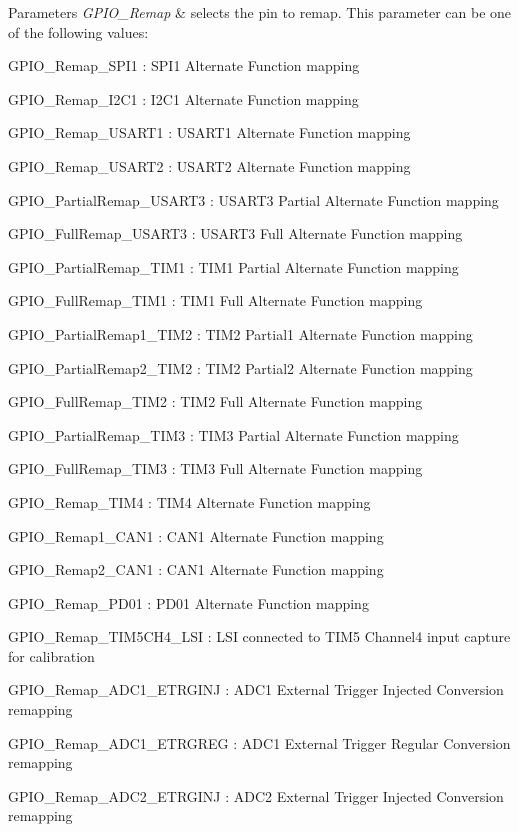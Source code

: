 \begin{DoxyParams}{Parameters}
{\em G\+P\+I\+O\+\_\+\+Remap} & selects the pin to remap. This parameter can be one of the following values\+: \begin{DoxyItemize}
\item G\+P\+I\+O\+\_\+\+Remap\+\_\+\+S\+P\+I1 \+: S\+P\+I1 Alternate Function mapping \item G\+P\+I\+O\+\_\+\+Remap\+\_\+\+I2\+C1 \+: I2\+C1 Alternate Function mapping \item G\+P\+I\+O\+\_\+\+Remap\+\_\+\+U\+S\+A\+R\+T1 \+: U\+S\+A\+R\+T1 Alternate Function mapping \item G\+P\+I\+O\+\_\+\+Remap\+\_\+\+U\+S\+A\+R\+T2 \+: U\+S\+A\+R\+T2 Alternate Function mapping \item G\+P\+I\+O\+\_\+\+Partial\+Remap\+\_\+\+U\+S\+A\+R\+T3 \+: U\+S\+A\+R\+T3 Partial Alternate Function mapping \item G\+P\+I\+O\+\_\+\+Full\+Remap\+\_\+\+U\+S\+A\+R\+T3 \+: U\+S\+A\+R\+T3 Full Alternate Function mapping \item G\+P\+I\+O\+\_\+\+Partial\+Remap\+\_\+\+T\+I\+M1 \+: T\+I\+M1 Partial Alternate Function mapping \item G\+P\+I\+O\+\_\+\+Full\+Remap\+\_\+\+T\+I\+M1 \+: T\+I\+M1 Full Alternate Function mapping \item G\+P\+I\+O\+\_\+\+Partial\+Remap1\+\_\+\+T\+I\+M2 \+: T\+I\+M2 Partial1 Alternate Function mapping \item G\+P\+I\+O\+\_\+\+Partial\+Remap2\+\_\+\+T\+I\+M2 \+: T\+I\+M2 Partial2 Alternate Function mapping \item G\+P\+I\+O\+\_\+\+Full\+Remap\+\_\+\+T\+I\+M2 \+: T\+I\+M2 Full Alternate Function mapping \item G\+P\+I\+O\+\_\+\+Partial\+Remap\+\_\+\+T\+I\+M3 \+: T\+I\+M3 Partial Alternate Function mapping \item G\+P\+I\+O\+\_\+\+Full\+Remap\+\_\+\+T\+I\+M3 \+: T\+I\+M3 Full Alternate Function mapping \item G\+P\+I\+O\+\_\+\+Remap\+\_\+\+T\+I\+M4 \+: T\+I\+M4 Alternate Function mapping \item G\+P\+I\+O\+\_\+\+Remap1\+\_\+\+C\+A\+N1 \+: C\+A\+N1 Alternate Function mapping \item G\+P\+I\+O\+\_\+\+Remap2\+\_\+\+C\+A\+N1 \+: C\+A\+N1 Alternate Function mapping \item G\+P\+I\+O\+\_\+\+Remap\+\_\+\+P\+D01 \+: P\+D01 Alternate Function mapping \item G\+P\+I\+O\+\_\+\+Remap\+\_\+\+T\+I\+M5\+C\+H4\+\_\+\+L\+SI \+: L\+SI connected to T\+I\+M5 Channel4 input capture for calibration \item G\+P\+I\+O\+\_\+\+Remap\+\_\+\+A\+D\+C1\+\_\+\+E\+T\+R\+G\+I\+NJ \+: A\+D\+C1 External Trigger Injected Conversion remapping \item G\+P\+I\+O\+\_\+\+Remap\+\_\+\+A\+D\+C1\+\_\+\+E\+T\+R\+G\+R\+EG \+: A\+D\+C1 External Trigger Regular Conversion remapping \item G\+P\+I\+O\+\_\+\+Remap\+\_\+\+A\+D\+C2\+\_\+\+E\+T\+R\+G\+I\+NJ \+: A\+D\+C2 External Trigger Injected Conversion remapping \item 
\end{DoxyItemize}
\end{DoxyParams}

